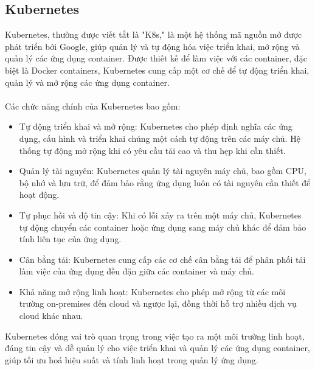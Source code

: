 \subsection{Kubernetes}
Kubernetes, thường được viết tắt là "K8s," là một hệ thống mã nguồn mở được phát triển bởi Google, giúp quản lý và tự động hóa việc triển khai, mở rộng và quản lý các ứng dụng container. Được thiết kế để làm việc với các container, đặc biệt là Docker containers, Kubernetes cung cấp một cơ chế để tự động triển khai, quản lý và mở rộng các ứng dụng container.\\
\\
Các chức năng chính của Kubernetes bao gồm:
\begin{itemize}
    \item Tự động triển khai và mở rộng: Kubernetes cho phép định nghĩa các ứng dụng, cấu hình và triển khai chúng một cách tự động trên các máy chủ. Hệ thống tự động mở rộng khi có yêu cầu tải cao và thu hẹp khi cần thiết.

    \item Quản lý tài nguyên: Kubernetes quản lý tài nguyên máy chủ, bao gồm CPU, bộ nhớ và lưu trữ, để đảm bảo rằng ứng dụng luôn có tài nguyên cần thiết để hoạt động.

    \item Tự phục hồi và độ tin cậy: Khi có lỗi xảy ra trên một máy chủ, Kubernetes tự động chuyển các container hoặc ứng dụng sang máy chủ khác để đảm bảo tính liên tục của ứng dụng.

    \item Cân bằng tải: Kubernetes cung cấp các cơ chế cân bằng tải để phân phối tải làm việc của ứng dụng đều đặn giữa các container và máy chủ.

    \item Khả năng mở rộng linh hoạt: Kubernetes cho phép mở rộng từ các môi trường on-premises đến cloud và ngược lại, đồng thời hỗ trợ nhiều dịch vụ cloud khác nhau.
\end{itemize}
Kubernetes đóng vai trò quan trọng trong việc tạo ra một môi trường linh hoạt, đáng tin cậy và dễ quản lý cho việc triển khai và quản lý các ứng dụng container, giúp tối ưu hoá hiệu suất và tính linh hoạt trong quản lý ứng dụng.
